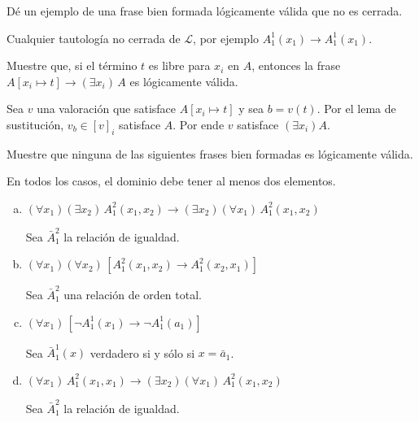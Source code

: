 \begin{exercise}
Dé un ejemplo de una frase bien formada lógicamente válida que no es cerrada.
\end{exercise}

\begin{solution}
Cualquier tautología no cerrada de $\mathscr L$, por ejemplo $A_1^1(x_1) \to A_1^1(x_1)$.
\end{solution}

\begin{exercise}
Muestre que, si el término $t$ es libre para $x_i$ en $A$, entonces la frase $A[x_i \mapsto t] \to (\exists x_i) \, A$ es lógicamente válida.
\end{exercise}

\begin{solution}
Sea $v$ una valoración que satisface $A[x_i \mapsto t]$ y sea $b = v(t)$. Por el lema de sustitución, $v_b \in [v]_i$ satisface $A$. Por ende $v$ satisface $(\exists x_i) A$.
\end{solution}

\begin{exercise}
Muestre que ninguna de las siguientes frases bien formadas es lógicamente válida.
\end{exercise}

\begin{remark}
En todos los casos, el dominio debe tener al menos dos elementos.
\end{remark}

\begin{enumerate}[(a)]
    \item $(\forall x_1) (\exists x_2) \, A_1^2(x_1, x_2) \to (\exists x_2) (\forall x_1) \, A_1^2(x_1, x_2)$
    \begin{solution}
    Sea $\bar A_1^2$ la relación de igualdad.
    \end{solution}
    
    \item $(\forall x_1) (\forall x_2) \, [A_1^2(x_1, x_2) \to A_1^2(x_2, x_1)]$
    \begin{solution}
    Sea $\bar A_1^2$ una relación de orden total.
    \end{solution}
    
    \item $(\forall x_1) \, [\neg A_1^1(x_1) \to \neg A_1^1(a_1)]$
    \begin{solution}
    Sea $\bar A_1^1(x)$ verdadero si y sólo si $x = \bar a_1$.
    \end{solution}
    
    \item $(\forall x_1) \, A_1^2(x_1, x_1) \to (\exists x_2) (\forall x_1) \, A_1^2(x_1, x_2)$
    \begin{solution}
    Sea $\bar A_1^2$ la relación de igualdad.
    \end{solution}
\end{enumerate}
